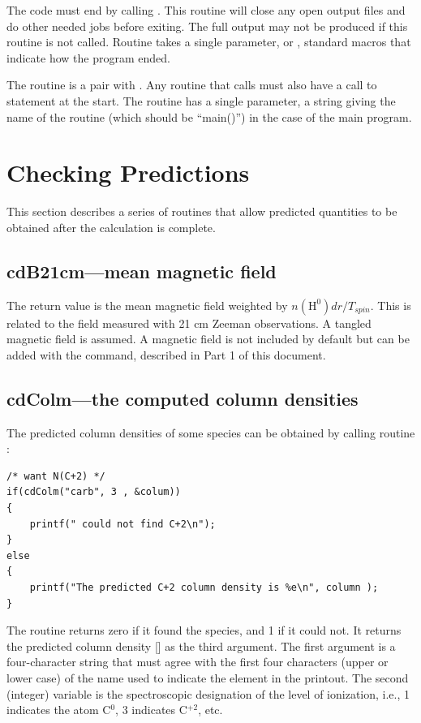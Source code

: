 The code must end by calling .
This routine will close any open
output files and do other needed jobs before exiting.
The full output may
not be produced if this routine is not called.
Routine  takes a single
parameter,  or ,
standard macros that indicate how
the program ended.

The routine  is a pair with .
Any routine that calls
 must also have a call to  statement at the start.  The
routine  has a single parameter, a string giving the name of
the routine (which should be ``main()'') in the case of the main program.

\section{Checking Predictions}

This section describes a series of routines that allow predicted
quantities to be obtained after the calculation is complete.

\subsection{cdB21cm---mean magnetic field}

The return value is the mean magnetic field weighted by
$n(\mathrm{H}^0) dr/T_{spin}$.
This is related to the field measured with 21 cm Zeeman
observations.
A tangled magnetic field is assumed.
A magnetic field is
not included by default but can be added with the
 command, described in Part 1 of this document.

\subsection{cdColm---the computed column densities }
\label{sec:SubroutineCdColm}

The predicted column densities of some species can be obtained by
calling routine :
\begin{verbatim}
/* want N(C+2) */
if(cdColm("carb", 3 , &colum))
{
    printf(" could not find C+2\n");
}
else
{
    printf("The predicted C+2 column density is %e\n", column );
}
\end{verbatim}
The routine returns zero if it found the species, and 1 if it could not.
It returns the predicted column density [\pscm] as the third argument.  The
first argument  is a four-character string that must agree with the
first four characters (upper or lower case) of the name used to indicate
the element in the printout.
The second (integer) variable  is the
spectroscopic designation of the level of ionization, i.e., 1 indicates
the atom C$^0$, 3 indicates C$^{+2}$, etc.

